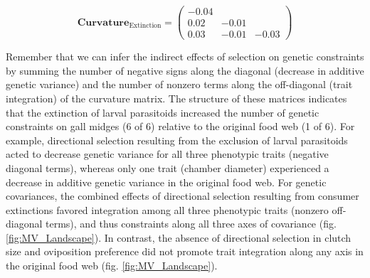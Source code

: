 \documentclass[11pt,]{article}
\begin{document}
\[\textbf{Curvature}_{\text{Extinction}} = \begin{pmatrix} 
-0.04 &  &  \\  
0.02 & -0.01 &  \\  
0.03 & -0.01 & -0.03 \end{pmatrix}\]

Remember that we can infer the indirect effects of selection on genetic
constraints by summing the number of negative signs along the diagonal
(decrease in additive genetic variance) and the number of nonzero terms
along the off-diagonal (trait integration) of the curvature matrix. The
structure of these matrices indicates that the extinction of larval
parasitoids increased the number of genetic constraints on gall midges
(6 of 6) relative to the original food web (1 of 6). For example,
directional selection resulting from the exclusion of larval parasitoids
acted to decrease genetic variance for all three phenotypic traits
(negative diagonal terms), whereas only one trait (chamber diameter)
experienced a decrease in additive genetic variance in the original food
web. For genetic covariances, the combined effects of directional
selection resulting from consumer extinctions favored integration among
all three phenotypic traits (nonzero off-diagonal terms), and thus
constraints along all three axes of covariance (fig.
\ref{fig:MV_Landscape}). In contrast, the absence of directional
selection in clutch size and oviposition preference did not promote
trait integration along any axis in the original food web (fig.
\ref{fig:MV_Landscape}).
\end{document}
